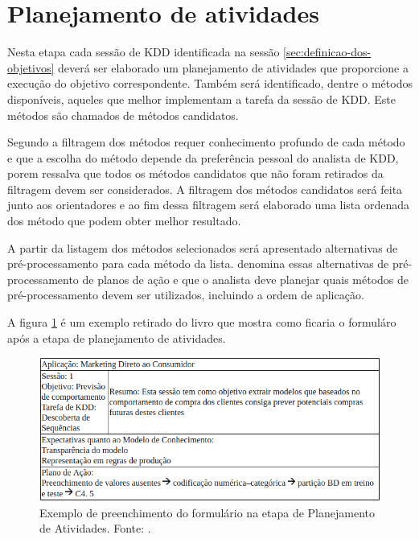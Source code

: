 \documentclass[diss-proposta,nocipinfo]{texufpel}
\begin{document}
\section{Planejamento de atividades}
\label{sec:planejamento-de-atividades}

Nesta etapa cada sessão de KDD identificada na sessão \ref{sec:definicao-dos-objetivos} deverá ser elaborado um planejamento de atividades que proporcione a execução do objetivo correspondente. Também será identificado, dentre o métodos disponíveis, aqueles que melhor implementam a tarefa da sessão de KDD. Este métodos são chamados de métodos candidatos.

Segundo \citet{goldschmidt2015data} a filtragem dos métodos requer conhecimento profundo de cada método e que a escolha do método depende da preferência pessoal do analista de KDD, porem ressalva que todos os métodos candidatos que não foram retirados da filtragem devem ser considerados. A filtragem dos métodos candidatos será feita junto aos orientadores e ao fim dessa filtragem será elaborado uma lista ordenada dos método que podem obter melhor resultado.

A partir da listagem dos métodos selecionados será apresentado alternativas de pré-processamento para cada método da lista. \citet{goldschmidt2015data} denomina essas alternativas de pré-processamento de planos de ação e que o analista deve planejar quais métodos de pré-processamento devem ser utilizados, incluindo a ordem de aplicação.

A figura \ref{fig:formulario-etapa-planejamento-atividades} é um exemplo retirado do livro que mostra como ficaria o formuláro após a etapa de planejamento de atividades.

\begin{figure}[htbp]
  \centering \includegraphics[scale=.4]{imagens/formulario-etapa-planejamento-atividades.png}
  \caption{Exemplo de preenchimento do formulário na etapa de Planejamento de Atividades. Fonte: \cite{goldschmidt2015data}.}
  \label{fig:formulario-etapa-planejamento-atividades}
\end{figure}
\end{document}

